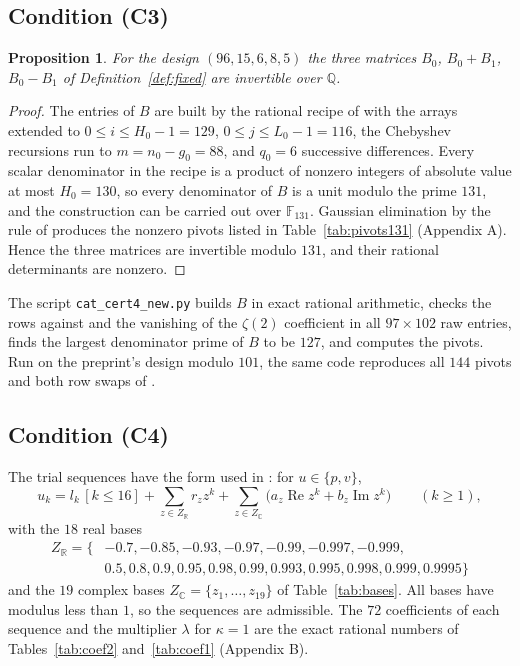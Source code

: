 \documentclass[11pt]{article}
\newtheorem{proposition}[theorem]{Proposition}
\theoremstyle{definition}
\begin{document}
\subsection{Condition (C3)}

\begin{proposition}\label{prop:c3}
For the design $(96,15,6,8,5)$ the three matrices $B_0$, $B_0+B_1$, $B_0-B_1$ of Definition~\ref{def:fixed} are invertible over $\mathbb Q$.
\end{proposition}

\begin{proof}
The entries of $B$ are built by the rational recipe of \cite[Sec.~4.4]{OAI} with the arrays extended to $0\le i\le H_0-1=129$, $0\le j\le L_0-1=116$, the Chebyshev recursions run to $m=n_0-g_0=88$, and $q_0=6$ successive differences. Every scalar denominator in the recipe is a product of nonzero integers of absolute value at most $H_0=130$, so every denominator of $B$ is a unit modulo the prime $131$, and the construction can be carried out over $\mathbb F_{131}$. Gaussian elimination by the rule of \cite[Sec.~4.4]{OAI} produces the nonzero pivots listed in Table~\ref{tab:pivots131} (Appendix A). Hence the three matrices are invertible modulo $131$, and their rational determinants are nonzero.
\end{proof}

The script \texttt{cat\_cert4\_new.py} builds $B$ in exact rational arithmetic, checks the rows against \cite[Eq.~(3)]{OAI} and the vanishing of the $\zeta(2)$ coefficient in all $97\times102$ raw entries, finds the largest denominator prime of $B$ to be $127$, and computes the pivots. Run on the preprint's design modulo $101$, the same code reproduces all $144$ pivots and both row swaps of \cite[Table~1]{OAI}.

\subsection{Condition (C4)}

The trial sequences have the form used in \cite[Sec.~7]{OAI}: for $u\in\{p,v\}$,
\[
u_k=l_k\,[k\le16]+\sum_{z\in Z_{\mathbb R}}r_zz^k+\sum_{z\in Z_{\mathbb C}}\big(a_z\operatorname{Re}z^k+b_z\operatorname{Im}z^k\big)\qquad(k\ge1),
\]
with the $18$ real bases
\begin{align*}
Z_{\mathbb R}=\{&-0.7,-0.85,-0.93,-0.97,-0.99,-0.997,-0.999,\\
&0.5,0.8,0.9,0.95,0.98,0.99,0.993,0.995,0.998,0.999,0.9995\}
\end{align*}
and the $19$ complex bases $Z_{\mathbb C}=\{z_1,\dots,z_{19}\}$ of Table~\ref{tab:bases}. All bases have modulus less than $1$, so the sequences are admissible. The $72$ coefficients of each sequence and the multiplier $\lambda$ for $\kappa=1$ are the exact rational numbers of Tables~\ref{tab:coef2} and~\ref{tab:coef1} (Appendix B).
\end{document}
